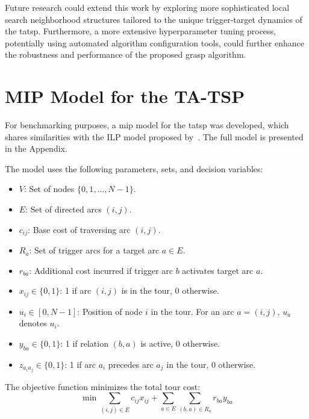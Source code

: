 \documentclass[twocolumn, switch]{article} %
\begin{document}
Future research could extend this work by exploring more sophisticated local search neighborhood structures tailored to the unique trigger-target dynamics of the \gls{tatsp}.
Furthermore, a more extensive hyperparameter tuning process, potentially using automated algorithm configuration tools, could further enhance the robustness and performance of the proposed \gls{grasp} algorithm.

\appendix
\section{MIP Model for the TA-TSP}
\label{sec:mip_model}
For benchmarking purposes, a \gls{mip} model for the \gls{tatsp} was developed, which shares similarities with the ILP model proposed by~\citet{Cerrone}.
The full model is presented in the Appendix.

The model uses the following parameters, sets, and decision variables:
\begin{itemize}
    \item $V$: Set of nodes $\{0, 1, \dots, N-1\}$.
    \item $E$: Set of directed arcs $(i,j)$.
    \item $c_{ij}$: Base cost of traversing arc $(i,j)$.
    \item $R_a$: Set of trigger arcs for a target arc $a \in E$.
    \item $r_{ba}$: Additional cost incurred if trigger arc $b$ activates target arc $a$.
    \item $x_{ij} \in \{0, 1\}$: 1 if arc $(i,j)$ is in the tour, 0 otherwise.
    \item $u_i \in [0, N-1]$: Position of node $i$ in the tour. For an arc $a=(i,j)$, $u_a$ denotes $u_i$.
    \item $y_{ba} \in \{0, 1\}$: 1 if relation $(b,a)$ is active, 0 otherwise.
    \item $z_{a_ia_j} \in \{0, 1\}$: 1 if arc $a_i$ precedes arc $a_j$ in the tour, 0 otherwise.
\end{itemize}

\footnotesize

The objective function minimizes the total tour cost:
\begin{equation} \label{eq:obj}
\min \sum_{(i,j) \in E} c_{ij} x_{ij} + \sum_{a \in E} \sum_{(b,a) \in R_a} r_{ba} y_{ba}
\end{equation}
\end{document}
